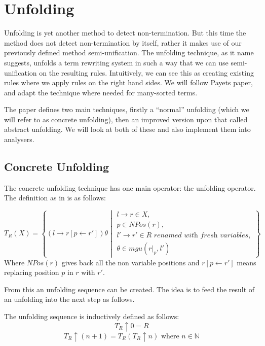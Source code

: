 \chapter{Unfolding}\label{unfolding}
Unfolding is yet another method to detect non-termination. But this time the method does not detect non-termination by itself, rather it makes use of our previously defined method semi-unification. The unfolding technique, as it name suggests, unfolds a term rewriting system in such a way that we can use semi-unification on the resulting rules. Intuitively, we can see this as creating existing rules where we apply rules on the right hand sides. We will follow Payets paper\cite{Payet:Unfolding}, and adapt the technique where needed for many-sorted terms. 

The paper defines two main techniques, firstly a ``normal'' unfolding (which we will refer to as concrete unfolding), then an improved version upon that called abstract unfolding. We will look at both of these and also implement them into analysers. 

\section{Concrete Unfolding}
The concrete unfolding technique has one main operator: the unfolding operator. The definition as in \cite{Payet:Unfolding} is as follows:
\begin{definition}
\[
T_R(X) = \left\{ \left( l \rightarrow r\left[ p \leftarrow r' \right] \right)\theta \middle\vert \begin{array}{l} 
l \rightarrow r \in X, \\
p \in \textit{NPos}(r), \\
l' \rightarrow r' \in R \textit{ renamed with fresh variables}, \\
\theta \in mgu(\left.r\right|_p, l')
\end{array}
\right\} 
\]
Where $\textit{NPos}(r)$ gives back all the non variable positions and $r\left[ p \leftarrow r'\right]$ means replacing position $p$ in $r$ with $r'$. 
\end{definition}

From this an unfolding sequence can be created. The idea is to feed the result of an unfolding into the next step as follows. 
\begin{definition}
The unfolding sequence is inductively defined as follows:
$$T_R \uparrow 0 = R$$
$$T_R \uparrow (n + 1) = T_R(T_R \uparrow n) \text{ where } n \in \mathbb{N}$$ 
\end{definition}

